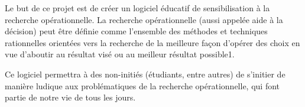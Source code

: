 \setcounter{footnote}{0}

Le but de ce projet est de créer un logiciel éducatif de sensibilisation à la recherche
opérationnelle. La recherche opérationnelle (aussi appelée aide à la décision) peut être définie
comme l'ensemble des méthodes et techniques rationnelles orientées vers la recherche de
la meilleure façon d'opérer des choix en vue d'aboutir au résultat visé ou au meilleur résultat possible1.

Ce logiciel permettra à des non-initiés (étudiants, entre autres) de s'initier
de manière ludique aux problématiques de la recherche opérationnelle, qui font partie de notre
vie de tous les jours.
